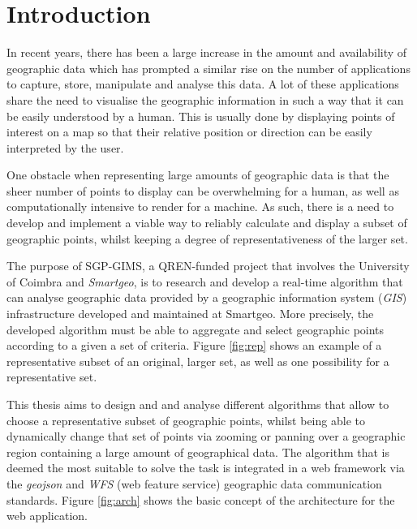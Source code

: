 \pagestyle{mypagestyle}

\setcounter{page}{1}

\cleardoublepage
\chapter{Introduction}
\label{chap:intro}

In recent years, there has been a large increase in the amount and availability of geographic data which has prompted a similar rise on the number of applications to capture, store, manipulate and analyse this data.
A lot of these applications share the need to visualise the geographic information in such a way that it can be easily understood by a human.
This is usually done by displaying points of interest on a map so that their relative position or direction can be easily interpreted by the user.

One obstacle when representing large amounts of geographic data is that the sheer number of points to display can be overwhelming for a human, as well as computationally intensive to render for a machine. As such, there is a need to develop and implement a viable way to reliably calculate and display a subset of geographic points, whilst keeping a degree of representativeness of the larger set.

The purpose of SGP-GIMS, a QREN-funded project that involves the University of Coimbra and \emph{Smartgeo}, is to research and develop a real-time algorithm that can analyse geographic data provided by a geographic information system (\emph{GIS}) infrastructure developed and maintained at Smartgeo. More precisely, the developed algorithm must be able to aggregate and select geographic points according to a given a set of criteria. Figure \ref{fig:rep} shows an example of a representative subset of an original, larger set, as well as one possibility for a representative set.



This thesis aims to design and and analyse different algorithms that allow to choose a representative subset of geographic points, whilst being able to dynamically change that set of points via zooming or panning over a geographic region containing a large amount of geographical data. 
The algorithm that is deemed the most suitable to solve the task is integrated in a web framework via the \emph{geojson} and \emph{WFS} (web feature service) geographic data communication standards. Figure \ref{fig:arch} shows the basic concept of the architecture for the web application.

